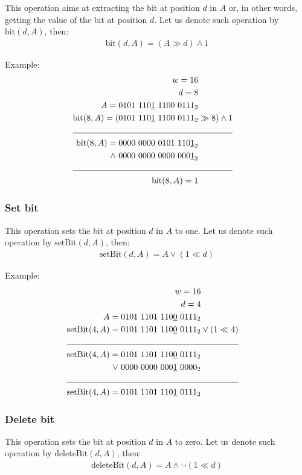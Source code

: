 This operation aims at extracting the bit at position $d$ in $A$ or, in other words, getting the value of the bit at position $d$. Let us denote such operation by $\text{bit}(d, A)$, then:
\begin{align*}
    \text{bit}(d, A) = (A \gg d) \wedge 1
\end{align*}

Example:
\begin{align*}
    w = 16\\
    d = 8\\
    A = 0101\ 110\underline{1}\ 1100\ 0111_2& \\
    \text{bit}(8,A) = (0101\ 110\underline{1}\ 1100\ 0111_2& \gg 8) \wedge 1 \\
    \cline{1-2}
    \text{bit}(8,A) = 0000\ 0000\ 0101\ 110\underline{1}_2& \\
    \wedge\ 0000\ 0000\ 0000\ 000\underline{1}_2 \\
    \cline{1-2}
    \text{bit}(8,A) = 1 &
\end{align*}

\subsubsection{Set bit}
This operation sets the bit at position $d$ in $A$ to one. Let us denote such operation by $\text{setBit}(d, A)$, then:
\begin{align*}
    \text{setBit}(d, A) = A \vee (1 \ll d)
\end{align*}

Example:
\begin{align*}
    w = 16\\
    d = 4\\
    A = 0101\ 1101\ 110\underline{0}\ 0111_2& \\
    \text{setBit}(4,A) = 0101\ 1101\ 110\underline{0}\ 0111_2& \vee (1 \ll 4) \\
    \cline{1-2}
    \text{setBit}(4,A) = 0101\ 1101\ 110\underline{0}\ 0111_2& \\
    \vee\  0000\ 0000\ 000\underline{1}\ 0000_2& \\
    \cline{1-2}
    \text{setBit}(4,A) = 0101\ 1101\ 110\underline{1}\ 0111_2&
\end{align*}

\subsubsection{Delete bit}
This operation sets the bit at position $d$ in $A$ to zero. Let us denote such operation by $\text{deleteBit}(d, A)$, then:
\begin{align*}
    \text{deleteBit}(d, A) = A \wedge \neg(1 \ll d)
\end{align*}

